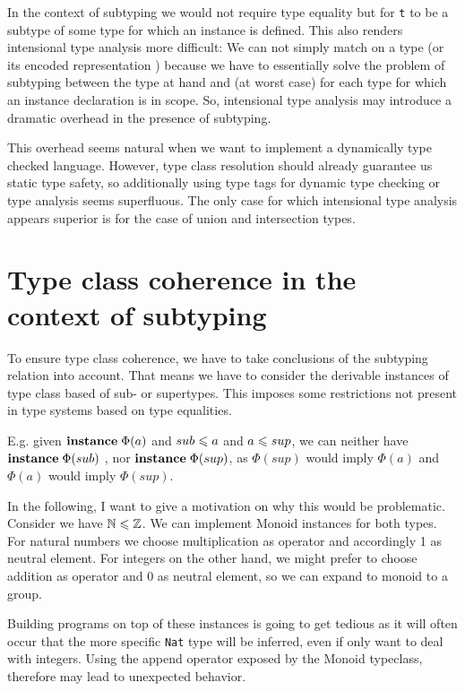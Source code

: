 In the context of subtyping we would not require type equality but for \texttt{t} to be a subtype of some type for which an instance is defined.
This also renders intensional type analysis more difficult:
We can not simply match on a type (or its encoded representation \cite{weirich2000}) because we have to essentially solve the problem of subtyping between the type at hand and (at worst case) for each type for which an instance declaration is in scope.
So, intensional type analysis may introduce a dramatic overhead in the presence of subtyping.

This overhead seems natural when we want to implement a dynamically type checked language.
However, type class resolution should already guarantee us static type safety, so additionally using type tags for dynamic type checking or type analysis seems superfluous.
The only case for which intensional type analysis appears superior is for the case of union and intersection types.

\section{Type class coherence in the context of subtyping}
  To ensure type class coherence, we have to take conclusions of the subtyping relation into account.
  That means we have to consider the derivable instances of type class based of sub- or supertypes.
  This imposes some restrictions not present in type systems based on type equalities.

  E.g. given ${\bf instance} \; \Phi(a)$ and $sub \leqslant a$ and $a \leqslant sup$, we can neither have ${\bf instance} \; \Phi(sub)$ , nor ${\bf instance} \; \Phi(sup)$,
  as $\Phi(sup)$ would imply $\Phi(a)$ and $\Phi(a)$ would imply $\Phi(sup)$.

  In the following, I want to give a motivation on why this would be problematic.
  Consider we have $\mathbb{N} \leqslant \mathbb{Z}$.
  We can implement Monoid instances for both types. For natural numbers we choose multiplication as operator and accordingly 1 as neutral element.
  For integers on the other hand, we might prefer to choose addition as operator and 0 as neutral element, so we can expand to monoid to a group.

  Building programs on top of these instances is going to get tedious as it will often occur that the more specific \texttt{Nat} type will be inferred,
  even if only want to deal with integers.
  Using the append operator exposed by the Monoid typeclass, therefore may lead to unexpected behavior.

